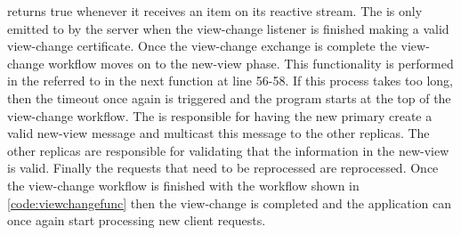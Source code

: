 returns true whenever it receives an item on its reactive stream. The  is only emitted to by the server when the view-change listener is finished making a valid view-change certificate. Once the view-change exchange is complete the view-change workflow moves on to the new-view phase. This functionality is performed in the  referred to in the next  function at line 56-58. If this process takes too long, then the timeout once again is triggered and the program starts at the top of the view-change workflow. The   is responsible for having the new primary create a valid new-view message and multicast this message to the other replicas. The other replicas are responsible for validating that the information in the new-view is valid. Finally the requests that need to be reprocessed are reprocessed. Once the view-change workflow is finished with the workflow shown in \autoref{code:viewchangefunc} then the view-change is completed and the application can once again start processing new client requests.


